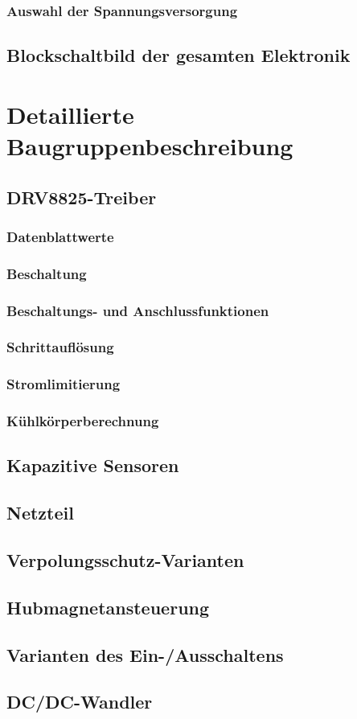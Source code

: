 \subsubsection{Auswahl der Spannungsversorgung}

\newpage

\subsection{Blockschaltbild der gesamten Elektronik}

\section{Detaillierte Baugruppenbeschreibung}

\subsection{DRV8825-Treiber}
\subsubsection{Datenblattwerte}
\subsubsection{Beschaltung}
\subsubsection{Beschaltungs- und Anschlussfunktionen}
\subsubsection{Schrittauflösung}
\subsubsection{Stromlimitierung}
\subsubsection{Kühlkörperberechnung}

\subsection{Kapazitive Sensoren}

\subsection{Netzteil}

\subsection{Verpolungsschutz-Varianten}

\subsection{Hubmagnetansteuerung}

\subsection{Varianten des Ein-/Ausschaltens}

\subsection{DC/DC-Wandler}




